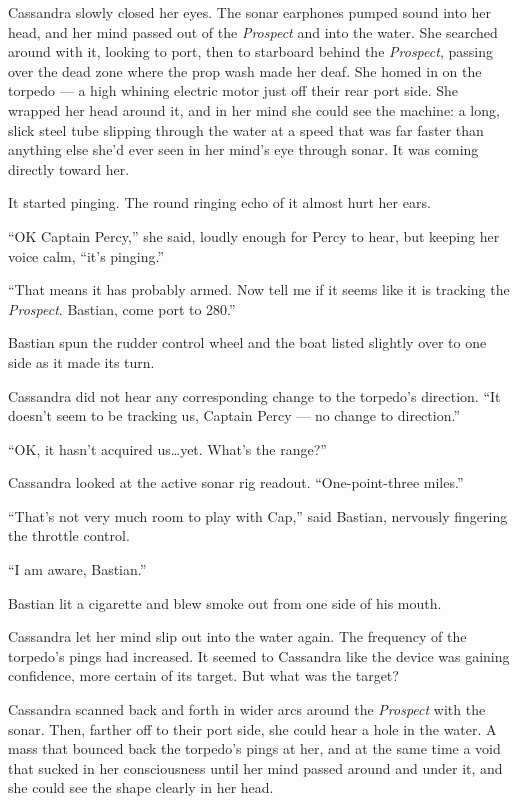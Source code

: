 \documentclass[
]{scrbook}
\begin{document}
Cassandra slowly closed her eyes. The sonar earphones pumped sound into
her head, and her mind passed out of the \emph{Prospect} and into the
water. She searched around with it, looking to port, then to starboard
behind the \emph{Prospect}, passing over the dead zone where the prop
wash made her deaf. She homed in on the torpedo --- a high whining
electric motor just off their rear port side. She wrapped her head
around it, and in her mind she could see the machine: a long, slick
steel tube slipping through the water at a speed that was far faster
than anything else she'd ever seen in her mind's eye through sonar. It
was coming directly toward her.

It started pinging. The round ringing echo of it almost hurt her ears.

``OK Captain Percy,'' she said, loudly enough for Percy to hear, but
keeping her voice calm, ``it's pinging.''

``That means it has probably armed. Now tell me if it seems like it is
tracking the \emph{Prospect}. Bastian, come port to 280.''

Bastian spun the rudder control wheel and the boat listed slightly over
to one side as it made its turn.

Cassandra did not hear any corresponding change to the torpedo's
direction. ``It doesn't seem to be tracking us, Captain Percy --- no
change to direction.''

``OK, it hasn't acquired us\ldots yet. What's the range?''

Cassandra looked at the active sonar rig readout. ``One-point-three
miles.''

``That's not very much room to play with Cap,'' said Bastian, nervously
fingering the throttle control.

``I am aware, Bastian.''

Bastian lit a cigarette and blew smoke out from one side of his mouth.

Cassandra let her mind slip out into the water again. The frequency of
the torpedo's pings had increased. It seemed to Cassandra like the
device was gaining confidence, more certain of its target. But what was
the target?

Cassandra scanned back and forth in wider arcs around the
\emph{Prospect} with the sonar. Then, farther off to their port side,
she could hear a hole in the water. A mass that bounced back the
torpedo's pings at her, and at the same time a void that sucked in her
consciousness until her mind passed around and under it, and she could
see the shape clearly in her head.
\end{document}
